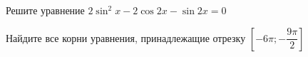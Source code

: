 \begin{ex}
	\begin{condition}
		\begin{enumcols}[label=\asbuk*)]
			\item Решите уравнение \( 2\sin^2 x -2\cos 2x -\sin 2x = 0 \)
			\item Найдите все корни уравнения, принадлежащие отрезку \( \left[-6\pi;-\dfrac{9\pi}{2}\right] \)
		\end{enumcols}
	\end{condition}
\end{ex}